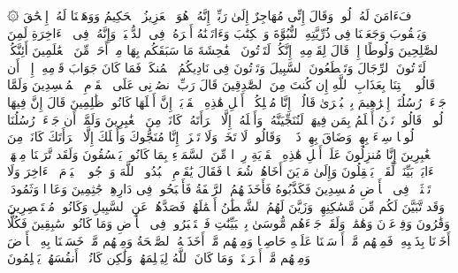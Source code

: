 \stopbuffer%
\startbuffer[\q:29:26]
۞ فَءَامَنَ لَهُۥ لُوطࣱۘ وَقَالَ إِنِّی مُهَاجِرٌ إِلَىٰ رَبِّیۤۖ إِنَّهُۥ هُوَ ٱلۡعَزِیزُ ٱلۡحَكِیمُ%
\stopbuffer%
\startbuffer[\q:29:27]
وَوَهَبۡنَا لَهُۥۤ إِسۡحَٰقَ وَیَعۡقُوبَ وَجَعَلۡنَا فِی ذُرِّیَّتِهِ ٱلنُّبُوَّةَ وَٱلۡكِتَٰبَ وَءَاتَیۡنَٰهُ أَجۡرَهُۥ فِی ٱلدُّنۡیَاۖ وَإِنَّهُۥ فِی ٱلۡءَاخِرَةِ لَمِنَ ٱلصَّٰلِحِینَ%
\stopbuffer%
\startbuffer[\q:29:28]
وَلُوطًا إِذۡ قَالَ لِقَوۡمِهِۦۤ إِنَّكُمۡ لَتَأۡتُونَ ٱلۡفَٰحِشَةَ مَا سَبَقَكُم بِهَا مِنۡ أَحَدࣲ مِّنَ ٱلۡعَٰلَمِینَ%
\stopbuffer%
\startbuffer[\q:29:29]
أَئِنَّكُمۡ لَتَأۡتُونَ ٱلرِّجَالَ وَتَقۡطَعُونَ ٱلسَّبِیلَ وَتَأۡتُونَ فِی نَادِیكُمُ ٱلۡمُنكَرَۖ فَمَا كَانَ جَوَابَ قَوۡمِهِۦۤ إِلَّاۤ أَن قَالُوا۟ ٱئۡتِنَا بِعَذَابِ ٱللَّهِ إِن كُنتَ مِنَ ٱلصَّٰدِقِینَ%
\stopbuffer%
\startbuffer[\q:29:30]
قَالَ رَبِّ ٱنصُرۡنِی عَلَى ٱلۡقَوۡمِ ٱلۡمُفۡسِدِینَ%
\stopbuffer%
\startbuffer[\q:29:31]
وَلَمَّا جَاۤءَتۡ رُسُلُنَاۤ إِبۡرَٰهِیمَ بِٱلۡبُشۡرَىٰ قَالُوۤا۟ إِنَّا مُهۡلِكُوۤا۟ أَهۡلِ هَٰذِهِ ٱلۡقَرۡیَةِۖ إِنَّ أَهۡلَهَا كَانُوا۟ ظَٰلِمِینَ%
\stopbuffer%
\startbuffer[\q:29:32]
قَالَ إِنَّ فِیهَا لُوطࣰاۚ قَالُوا۟ نَحۡنُ أَعۡلَمُ بِمَن فِیهَاۖ لَنُنَجِّیَنَّهُۥ وَأَهۡلَهُۥۤ إِلَّا ٱمۡرَأَتَهُۥ كَانَتۡ مِنَ ٱلۡغَٰبِرِینَ%
\stopbuffer%
\startbuffer[\q:29:33]
وَلَمَّاۤ أَن جَاۤءَتۡ رُسُلُنَا لُوطࣰا سِیۤءَ بِهِمۡ وَضَاقَ بِهِمۡ ذَرۡعࣰاۖ وَقَالُوا۟ لَا تَخَفۡ وَلَا تَحۡزَنۡ إِنَّا مُنَجُّوكَ وَأَهۡلَكَ إِلَّا ٱمۡرَأَتَكَ كَانَتۡ مِنَ ٱلۡغَٰبِرِینَ%
\stopbuffer%
\startbuffer[\q:29:34]
إِنَّا مُنزِلُونَ عَلَىٰۤ أَهۡلِ هَٰذِهِ ٱلۡقَرۡیَةِ رِجۡزࣰا مِّنَ ٱلسَّمَاۤءِ بِمَا كَانُوا۟ یَفۡسُقُونَ%
\stopbuffer%
\startbuffer[\q:29:35]
وَلَقَد تَّرَكۡنَا مِنۡهَاۤ ءَایَةَۢ بَیِّنَةࣰ لِّقَوۡمࣲ یَعۡقِلُونَ%
\stopbuffer%
\startbuffer[\q:29:36]
وَإِلَىٰ مَدۡیَنَ أَخَاهُمۡ شُعَیۡبࣰا فَقَالَ یَٰقَوۡمِ ٱعۡبُدُوا۟ ٱللَّهَ وَٱرۡجُوا۟ ٱلۡیَوۡمَ ٱلۡءَاخِرَ وَلَا تَعۡثَوۡا۟ فِی ٱلۡأَرۡضِ مُفۡسِدِینَ%
\stopbuffer%
\startbuffer[\q:29:37]
فَكَذَّبُوهُ فَأَخَذَتۡهُمُ ٱلرَّجۡفَةُ فَأَصۡبَحُوا۟ فِی دَارِهِمۡ جَٰثِمِینَ%
\stopbuffer%
\startbuffer[\q:29:38]
وَعَادࣰا وَثَمُودَا۟ وَقَد تَّبَیَّنَ لَكُم مِّن مَّسَٰكِنِهِمۡۖ وَزَیَّنَ لَهُمُ ٱلشَّیۡطَٰنُ أَعۡمَٰلَهُمۡ فَصَدَّهُمۡ عَنِ ٱلسَّبِیلِ وَكَانُوا۟ مُسۡتَبۡصِرِینَ%
\stopbuffer%
\startbuffer[\q:29:39]
وَقَٰرُونَ وَفِرۡعَوۡنَ وَهَٰمَٰنَۖ وَلَقَدۡ جَاۤءَهُم مُّوسَىٰ بِٱلۡبَیِّنَٰتِ فَٱسۡتَكۡبَرُوا۟ فِی ٱلۡأَرۡضِ وَمَا كَانُوا۟ سَٰبِقِینَ%
\stopbuffer%
\startbuffer[\q:29:40]
فَكُلًّا أَخَذۡنَا بِذَنۢبِهِۦۖ فَمِنۡهُم مَّنۡ أَرۡسَلۡنَا عَلَیۡهِ حَاصِبࣰا وَمِنۡهُم مَّنۡ أَخَذَتۡهُ ٱلصَّیۡحَةُ وَمِنۡهُم مَّنۡ خَسَفۡنَا بِهِ ٱلۡأَرۡضَ وَمِنۡهُم مَّنۡ أَغۡرَقۡنَاۚ وَمَا كَانَ ٱللَّهُ لِیَظۡلِمَهُمۡ وَلَٰكِن كَانُوۤا۟ أَنفُسَهُمۡ یَظۡلِمُونَ%
